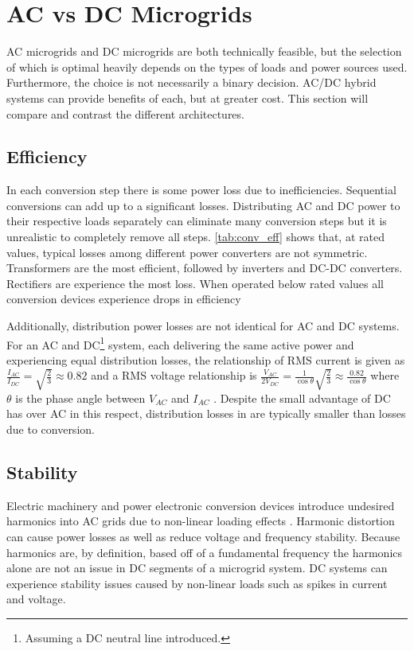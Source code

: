 
\section{AC vs DC Microgrids}
AC microgrids and DC microgrids are both technically feasible, but the selection of which is optimal heavily depends on the types of loads and power sources used. Furthermore, the choice is not necessarily a binary decision. AC/DC hybrid systems can provide benefits of each, but at greater cost. This section will compare and contrast the different architectures.

\subsection{Efficiency}
In each conversion step there is some power loss due to inefficiencies. Sequential conversions can add up to a significant losses. Distributing AC and DC power to their respective loads separately can eliminate many conversion steps but it is unrealistic to completely remove all steps. \autoref{tab:conv_eff} shows that, at rated values, typical losses among different power converters are not symmetric. Transformers are the most efficient, followed by inverters and DC-DC converters. Rectifiers are experience the most loss. When operated below rated values all conversion devices experience drops in efficiency

 

Additionally, distribution power losses are not identical for AC and DC systems. For an AC and DC\footnote{Assuming a DC neutral line introduced.} system, each delivering the same active power and experiencing equal distribution losses, the relationship of RMS current is given as $\frac{I_{AC}}{I_{DC}} = \sqrt{\frac{2}{3}} \approx 0.82$ and a RMS voltage relationship is $\frac{V_{AC}}{2V_{DC}} = \frac{1}{\cos{\theta}} \sqrt{\frac{2}{3}} \approx \frac{0.82}{\cos{\theta}}$ where $\theta$ is the phase angle between $V_{AC}$ and $I_{AC}$ \cite{Starke2008}. Despite the small advantage of DC has over AC in this respect, distribution losses in are typically smaller than losses due to conversion.

\subsection{Stability}
Electric machinery and power electronic conversion devices introduce undesired harmonics into AC grids due to non-linear loading effects \cite{Grotzbach1997}. Harmonic distortion can cause power losses as well as reduce voltage and frequency stability. Because harmonics are, by definition, based off of a fundamental frequency the harmonics alone are not an issue in DC segments of a microgrid system. DC systems can experience stability issues caused by non-linear loads such as spikes in current and voltage.

